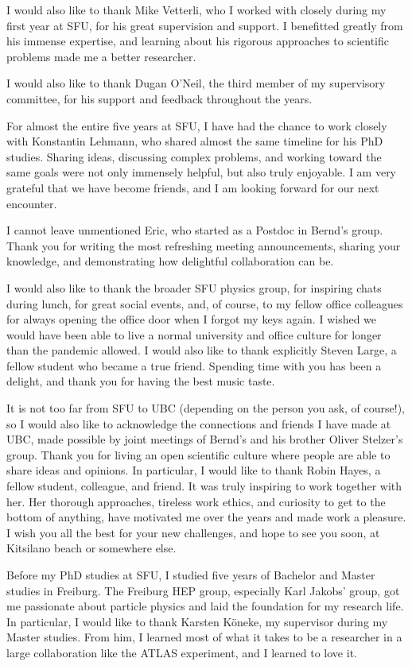 I would also like to thank Mike Vetterli, who I worked with closely during my first year at SFU, for his great supervision and support.
I benefitted greatly from his immense expertise, and learning about his rigorous approaches to scientific problems made me a better researcher. 

I would also like to thank Dugan O'Neil, the third member of my supervisory committee, for his support and feedback throughout the years. 

For almost the entire five years at SFU, I have had the chance to work closely with Konstantin Lehmann, who shared almost the same timeline for his PhD studies. Sharing ideas, discussing complex problems, and working toward the same goals were not only immensely helpful, but also truly enjoyable. I am very grateful that we have become friends, and I am looking forward for our next encounter. 

I cannot leave unmentioned Eric, who started as a Postdoc in Bernd's group. Thank you for writing the most refreshing meeting announcements, sharing your knowledge, and demonstrating how delightful collaboration can be.

I would also like to thank the broader SFU physics group, for inspiring chats during lunch, for great social events, and, of course, to my fellow office colleagues for always opening the office door when I forgot my keys again. 
I wished we would have been able to live a normal university and office culture for longer than the pandemic allowed. 
I would also like to thank explicitly Steven Large, a fellow student who became a true friend. Spending time with you has been a delight, and thank you for having the best music taste. 

It is not too far from SFU to UBC (depending on the person you ask, of course!), so I would also like to acknowledge the connections and friends I have made at UBC, made possible by joint meetings of Bernd's and his brother Oliver Stelzer's group. 
Thank you for living an open scientific culture where people are able to share ideas and opinions. 
In particular, I would like to thank Robin Hayes, a fellow student, colleague, and friend. It was truly inspiring to work together with her. Her thorough approaches, tireless work ethics, and curiosity to get to the bottom of anything, have motivated me over the years and made work a pleasure. I wish you all the best for your new challenges, and hope to see you soon, at Kitsilano beach or somewhere else. 

Before my PhD studies at SFU, I studied five years of Bachelor and Master studies in Freiburg. 
The Freiburg HEP group, especially Karl Jakobs' group, got me passionate about particle physics and laid the foundation for my research life.
In particular, I would like to thank Karsten Köneke, my supervisor during my Master studies.
From him, I learned most of what it takes to be a researcher in a large collaboration like the ATLAS experiment, and I learned to love it.   

